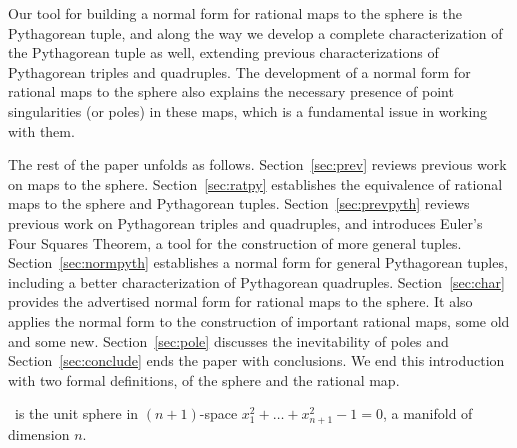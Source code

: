 \documentclass[12pt]{article}
\begin{document}
Our tool for building a normal form for rational maps to the sphere
is the Pythagorean tuple, and along the way we develop a complete characterization
of the Pythagorean tuple as well, extending previous characterizations of
Pythagorean triples and quadruples.
%
The development of a normal form for rational maps to the sphere also
explains the necessary presence of point singularities (or poles) in these maps,
which is a fundamental issue in working with them.
 
The rest of the paper unfolds as follows.
Section~\ref{sec:prev} reviews previous work on maps to the sphere.
Section~\ref{sec:ratpy} establishes the equivalence of rational maps 
to the sphere and Pythagorean tuples.
Section~\ref{sec:prevpyth} reviews previous work on Pythagorean triples 
and quadruples, and introduces Euler's Four Squares Theorem, a tool
for the construction of more general tuples.
Section~\ref{sec:normpyth} establishes a normal form for general Pythagorean 
tuples, including a better characterization of Pythagorean quadruples.
Section~\ref{sec:char} provides the advertised normal form for rational maps 
to the sphere.
It also applies the normal form to the construction of
important rational maps, some old and some new.  
Section~\ref{sec:pole} discusses the inevitability of poles
and Section~\ref{sec:conclude} ends the paper with conclusions.
We end this introduction with two formal definitions,
of the sphere and the rational map.

%

\begin{defn2}
\ is the unit sphere in $(n+1)$-space $x_1^2 + \ldots + x_{n+1}^2 - 1 = 0$,
a manifold of dimension $n$.
\end{defn2}
\end{document}
